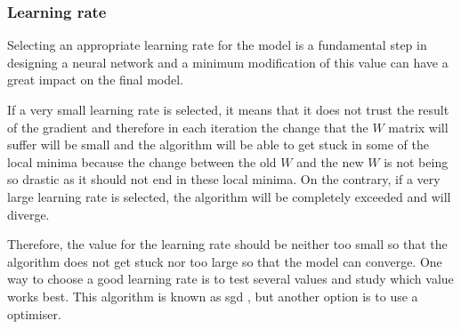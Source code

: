 \subsubsection{Learning rate}\label{learningrate}
Selecting an appropriate learning rate for the model is a fundamental step in designing a neural network and a minimum modification of this value can have a great impact on the final model.
\newline


If a very small learning rate is selected, it means that it does not trust the result of the gradient and therefore in each iteration the change that the $W$ matrix will suffer will be small and the algorithm will be able to get stuck in some of the local minima because the change between the old $W$ and the new $W$ is not being so drastic as it should not end in these local minima. On the contrary, if a very large learning rate is selected, the algorithm will be completely exceeded and will diverge.
\newline


Therefore, the value for the learning rate should be neither too small so that the algorithm does not get stuck nor too large so that the model can converge. One way to choose a good learning rate is to test several values and study which value works best. This algorithm is known as \acrfull{sgd} \cite{kiefer}, but another option is to use a optimiser.
\newline